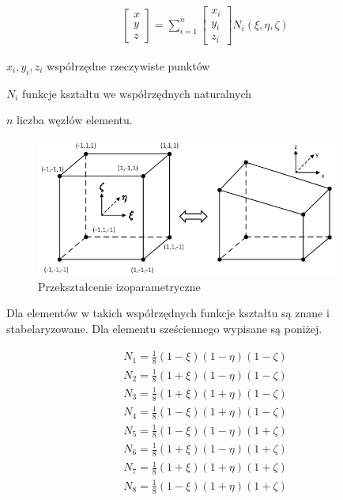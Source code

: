 \begin{gather}
	\begin{bmatrix} 
	 	x \\
		y \\
		z 
	\end{bmatrix} = \sum_{i=1}^n
	\begin{bmatrix} 
	 	x_i \\
		y_i \\
		z_i 
	\end{bmatrix} N_i(\xi, \eta, \zeta)
\end{gather}

\begin{eqwhere}[2cm]
	\item[$x_i, y_i, z_i$] współrzędne rzeczywiste punktów
	\item[$N_i$] funkcje kształtu we współrzędnych naturalnych
	\item[$n$] liczba węzłów elementu.
\end{eqwhere}

\begin{figure}[h]
\centering
\includegraphics[width=10cm]{Zdjecia/3/izoparam}
\caption{Przekształcenie izoparametryczne}
\label{fig:izoparam}
\end{figure}

Dla elementów w takich współrzędnych funkcje kształtu są znane i stabelaryzowane. Dla elementu sześciennego wypisane są poniżej.

\begin{equation} \label{eq:f_ksztaltu_hex}
	\begin{aligned}
		N_1 = \frac{1}{8}(1-\xi)(1-\eta)(1-\zeta) \\
		N_2 = \frac{1}{8}(1+\xi)(1-\eta)(1-\zeta) \\
		N_3 = \frac{1}{8}(1+\xi)(1+\eta)(1-\zeta) \\
		N_4 = \frac{1}{8}(1-\xi)(1+\eta)(1-\zeta) \\
		N_5 = \frac{1}{8}(1-\xi)(1-\eta)(1+\zeta) \\
		N_6 = \frac{1}{8}(1+\xi)(1-\eta)(1+\zeta) \\
		N_7 = \frac{1}{8}(1+\xi)(1+\eta)(1+\zeta) \\
		N_8 = \frac{1}{8}(1-\xi)(1+\eta)(1+\zeta)
	\end{aligned}
\end{equation}

